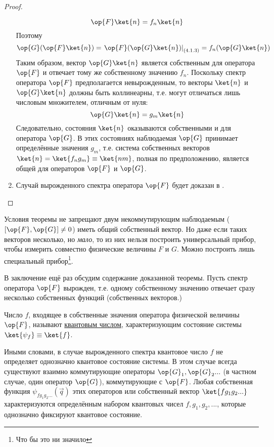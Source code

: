 \begin{proof}
\begin{enumerate}
\begin{equation}
  \label{eq:4_1_3}
  \op{F} \ket{n} = f_n \ket{n}
\end{equation}%
%
Поэтому
$$
  \op{G}(\op{F} \ket{n}) =
    \left. \op{F}(\op{G}\ket{n}) \right|_{(4.1.3)} =
    f_n (\op{G}\ket{n})
$$%
%
Таким образом, вектор $\op{G} \ket{n}$ является собственным для оператора $\op{F}$ и отвечает тому же собственному значению $f_n$. Поскольку спектр оператора $\op{F}$ предполагается невырожденным, то векторы $\ket{n}$ и $\op{G} \ket{n}$ должны быть коллинеарны, т.е. могут отличаться лишь числовым множителем, отличным от нуля:
$$
\op{G} \ket{n} = g_m \ket{n}
$$%
%
Следовательно, состояния $\ket{n}$ оказываются собственными и для оператора $\op{G}$. В этих состояниях наблюдаемая $\op{G}$ принимает определённые значения $g_m$, т.е. система собственных векторов $\ket{n} = \ket{f_n g_m} \equiv \ket{nm}$, полная по предположению, является общей для операторов $\op{F}$ и $\op{G}$.

\item Случай вырожденного спектра оператора $\op{F}$ будет доказан в .
\end{enumerate}
\end{proof}

Условия теоремы не запрещают двум некоммутирующим наблюдаемым ($[\op{F},\op{G}] \ne 0$) иметь общий собственный вектор. Но даже если таких векторов несколько, но {\em мало}, то из них нельзя построить универсальный прибор, чтобы измерить совместно физические величины $F$ и $G$. Можно построить лишь специальный прибор\footnote{Что бы это ни значило}.

В заключение ещё раз обсудим содержание доказанной теоремы. Пусть спектр оператора $\op{F}$ вырожден, т.е. одному собственному значению отвечает сразу несколько собственных функций (собственных векторов.)

\begin{defn}
Число $f$, входящее в собственные значения оператора физической величины $\op{F}$, называют \underline{квантовым числом}, характеризующим состояние системы $\ket{\psi_f} \equiv \ket{f}$.
\end{defn}%
%
Иными словами, в случае вырожденного спектра квантовое число $f$ не определяет однозначно квантовое состояние системы. В этом случае всегда существуют взаимно коммутирующие операторы $\op{G}_1, \op{G}_2...$ (в частном случае, один оператор $\op{G}$), коммутирующие с $\op{F}$. Любая собственная функция $\psi_{f g_1 g_2 ...}(\vec{q})$ этих операторов или собственный вектор $\ket{f g_1 g_2 ...}$ характеризуются определённым набором квантовых чисел $f, g_1, g_2, ...$, которые однозначно фиксируют квантовое состояние.

